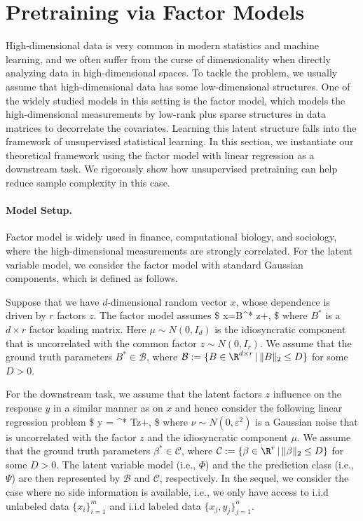 \section{Pretraining via Factor Models}\label{factor_model}

High-dimensional data is very common in modern statistics and machine learning, and we often suffer from the curse of dimensionality when directly analyzing data in high-dimensional spaces. To tackle the problem, we usually assume that high-dimensional data has some low-dimensional structures. One of the widely studied models in this setting is the factor model, which models the high-dimensional measurements by low-rank plus sparse structures in data matrices to decorrelate the covariates. Learning this latent structure falls into the framework of unsupervised statistical learning. In this section, we instantiate our theoretical framework using the factor model with linear regression as a downstream task. We rigorously show how unsupervised pretraining can help reduce sample complexity in this case.

\paragraph{Model Setup.}
Factor model \citep[see, e.g.,][]{lawley1971factor,bai2002determining,forni2005generalized,fan2021robust} is widely used in finance, computational biology, and sociology, where the high-dimensional measurements are strongly correlated. For the latent variable model, we consider the factor model with standard Gaussian components, which is defined as follows.
\begin{definition}
Suppose that we have $d$-dimensional random vector $x$, whose dependence is driven by $r$ factors $z$. The factor model assumes 
\$
x=B^* z+\mu,
\$
where $B^* $ is a $d\times r$ factor loading matrix. Here $\mu\sim N(0, I_d)$ is the idiosyncratic component that is uncorrelated with the common factor $z\sim N(0,I_r)$. We assume that the ground truth parameters $B^* \in\mathcal{B}$, where $\mathcal{B}:=\{B\in\R^{d\times r}\,|\,\|B\|_2\leq D\}$ for some $D>0$.
\end{definition}

For the downstream task, we assume that the latent factors $z$ influence on the response $y$ in a similar manner as on $x$ and hence consider the following linear regression problem
\$
y = \beta^{* T}z+\nu,
\$
where $\nu\sim N(0,\varepsilon^2)$  is a Gaussian noise that is uncorrelated with the factor $z$ and the idiosyncratic component $\mu$. We assume that the ground truth parameters $\beta^* \in\mathcal{C}$, where $\mathcal{C}:=\{\beta\in\R^r\,|\,\|\beta\|_2\leq D\}$ for some $D>0$. The latent variable model (i.e., $\Phi$) and the the prediction class (i.e.,$\Psi$) are then represented by $\mathcal{B}$ and $\mathcal{C}$, respectively. In the sequel, we consider the case where no side information is available, i.e., we only have access to i.i.d unlabeled data $\{x_i\}^m_{i=1}$ and i.i.d labeled data $\{x_j,y_j\}^n_{j=1}$.

